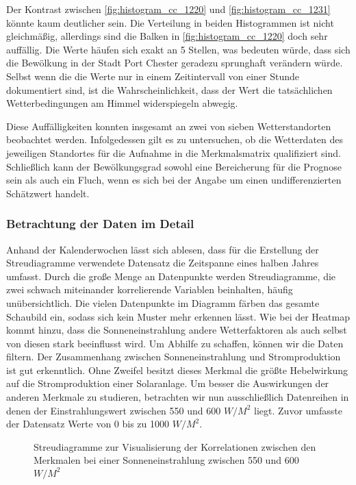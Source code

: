 \documentclass[12pt, a4paper]{article}
\begin{document}
Der Kontrast zwischen \autoref{fig:histogram_cc_1220} und \autoref{fig:histogram_cc_1231} könnte kaum deutlicher sein. Die Verteilung in beiden Histogrammen ist nicht gleichmäßig, allerdings sind die Balken in \autoref{fig:histogram_cc_1220} doch sehr auffällig. Die Werte häufen sich exakt an 5 Stellen, was bedeuten würde, dass sich die Bewölkung in der Stadt Port Chester geradezu sprunghaft verändern würde. Selbst wenn die die Werte nur in einem Zeitintervall von einer Stunde dokumentiert sind, ist die Wahrscheinlichkeit, dass der Wert die tatsächlichen Wetterbedingungen am Himmel widerspiegeln abwegig.

Diese Auffälligkeiten konnten insgesamt an zwei von sieben Wetterstandorten beobachtet werden. Infolgedessen gilt es zu untersuchen, ob die Wetterdaten des jeweiligen Standortes für die Aufnahme in die Merkmalsmatrix qualifiziert sind. Schließlich kann der Bewölkungsgrad sowohl eine Bereicherung für die Prognose sein als auch ein Fluch, wenn es sich bei der Angabe um einen undifferenzierten Schätzwert handelt.

\subsubsection{Betrachtung der Daten im Detail}

Anhand der Kalenderwochen lässt sich ablesen, dass für die Erstellung der Streudiagramme verwendete Datensatz die Zeitspanne eines halben Jahres umfasst. Durch die große Menge an Datenpunkte werden Streudiagramme, die zwei schwach miteinander korrelierende Variablen beinhalten, häufig unübersichtlich. Die vielen Datenpunkte im Diagramm färben das gesamte Schaubild ein, sodass sich kein Muster mehr erkennen lässt. Wie bei der Heatmap kommt hinzu, dass die Sonneneinstrahlung andere Wetterfaktoren als auch selbst von diesen stark beeinflusst wird. Um Abhilfe zu schaffen, können wir die Daten filtern. Der Zusammenhang zwischen Sonneneinstrahlung und Stromproduktion ist gut erkenntlich. Ohne Zweifel besitzt dieses Merkmal die größte Hebelwirkung auf die Stromproduktion einer Solaranlage. Um besser die Auswirkungen der anderen Merkmale zu studieren, betrachten wir nun ausschließlich Datenreihen in denen der Einstrahlungswert zwischen 550 und 600 $W/ M^2$ liegt. Zuvor umfasste der Datensatz Werte von 0 bis zu 1000 $W/ M^2$.

\begin{figure}
\centering
\def\svgwidth{450pt}

\caption{Streudiagramme zur Visualisierung der Korrelationen zwischen den Merkmalen bei einer Sonneneinstrahlung zwischen 550 und 600 $W/ M^2$}
\label{fig:pairplot_filtered}
\end {figure}
\end{document}
